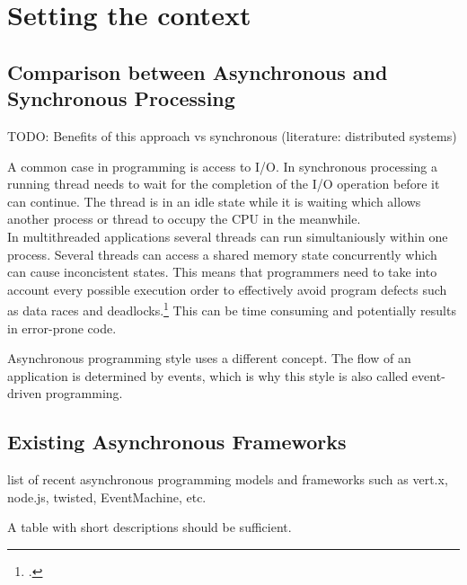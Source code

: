 \section{Setting the context}
\label{setting_the_context}

\subsection{Comparison between Asynchronous and Synchronous Processing}
\label{comparison}
TODO: Benefits of this approach vs synchronous (literature: distributed systems)

A common case in programming is access to I/O.
In synchronous processing a running thread needs to wait for the completion of
the I/O operation before it can continue.
The thread is in an idle state while it is waiting which allows another process 
or thread to occupy the CPU in the meanwhile.\\

In multithreaded applications several threads can run simultaniously within one
process. Several threads can access a shared memory state concurrently which can
cause inconcistent states. This means that programmers need to take into account every possible
execution order to effectively avoid program defects such as data races and deadlocks.\footcite[Cf.][10]{Breshears_2009}
This can be time consuming and potentially results in error-prone code.


Asynchronous programming style uses a different concept. The flow of an
application is determined by events, which is why this style is also called
event-driven programming.



\subsection{Existing Asynchronous Frameworks}
\label{existing_frameworks}
list of recent asynchronous programming models and frameworks such as vert.x,
node.js, twisted, EventMachine, etc.

A table with short descriptions should be sufficient.

